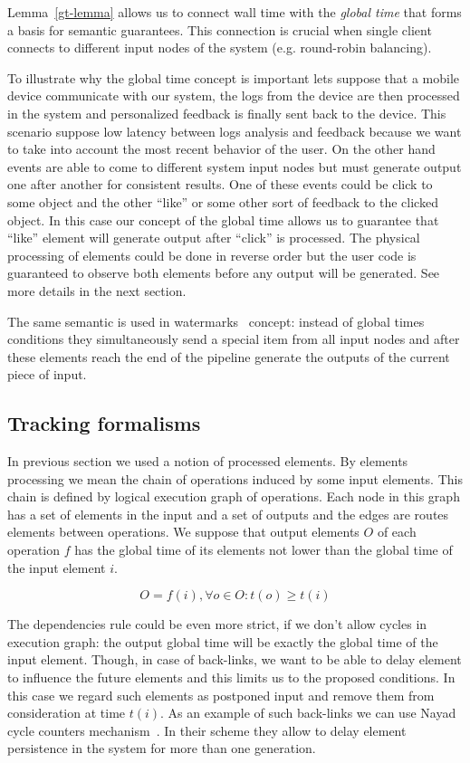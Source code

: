 Lemma~\ref{gt-lemma} allows us to connect wall time with the \textit{global time} that forms a basis for semantic guarantees. This connection is crucial when single client connects to different input nodes of the system (e.g. round-robin balancing).

To illustrate why the global time concept is important lets suppose that a mobile device communicate with our system, the logs from the device are then processed in the system and personalized feedback is finally sent back to the device. This scenario suppose low latency between logs analysis and feedback because we want to take into account the most recent behavior of the user. On the other hand events are able to come to different system input nodes but must generate output one after another for consistent results. One of these events could be click to some object and the other ``like'' or some other sort of feedback to the clicked object. In this case our concept of the global time allows us to guarantee that ``like'' element will generate output after ``click'' is processed. The physical processing of elements could be done in reverse order but the user code is guaranteed to observe both elements before any output will be generated. See more details in the next section.

The same semantic is used in watermarks~\cite{Carbone:2017:SMA:3137765.3137777} concept: instead of global times conditions they simultaneously send a special item from all input nodes and after these elements reach the end of the pipeline generate the outputs of the current piece of input.

\subsection{Tracking formalisms}
In previous section we used a notion of processed elements. By elements processing we mean the chain of operations induced by some input elements. This chain is defined by logical execution graph of operations. Each node in this graph has a set of elements in the input and a set of outputs and the edges are routes elements between operations. We suppose that output elements $O$ of each operation $f$ has the global time of its elements not lower than the global time of the input element $i$.

\begin{equation}
    O = f(i), \forall o \in O: t(o) \ge t(i)
\end{equation}

The dependencies rule could be even more strict, if we don't allow cycles in execution graph: the output global time will be exactly the global time of the input element. Though, in case of back-links, we want to be able to delay element to influence the future elements and this limits us to the proposed conditions. In this case we regard such elements as postponed input and remove them from consideration at time $t(i)$. As an example of such back-links we can use Nayad cycle counters mechanism~\cite{Nayad}. In their scheme they allow to delay element persistence in the system for more than one generation.

